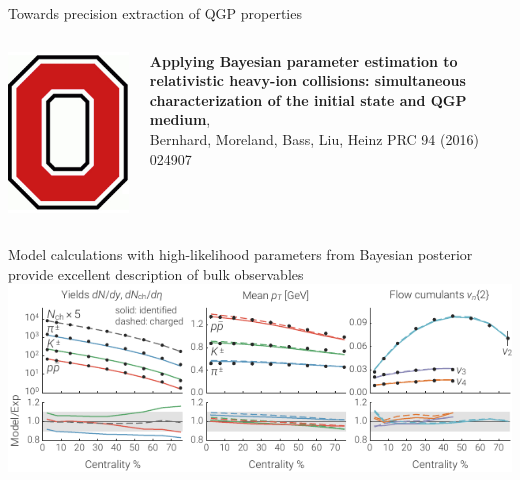 \documentclass{beamer}
\begin{document}
\begin{frame}{Towards precision extraction of QGP properties}
\begin{columns}[T]
\begin{column}{0.05\textwidth}
      \includegraphics[width=.9\columnwidth]{osu}
    \end{column}
    \begin{column}{0.9\textwidth}
      \scriptsize {}
      \textbf{Applying Bayesian parameter estimation to relativistic heavy-ion collisions: simultaneous characterization of the initial state and QGP medium},\\
      Bernhard, Moreland, Bass, Liu, Heinz PRC 94 (2016) 024907
    \end{column}
    \begin{column}{0.025\textwidth}
    \end{column}
  \end{columns}

  \begin{center}
    {\small Model calculations with high-likelihood parameters from Bayesian posterior
    provide excellent description of bulk observables}\\[1ex]
    \includegraphics{mode_observables}
  \end{center}
\end{frame}
\end{document}
